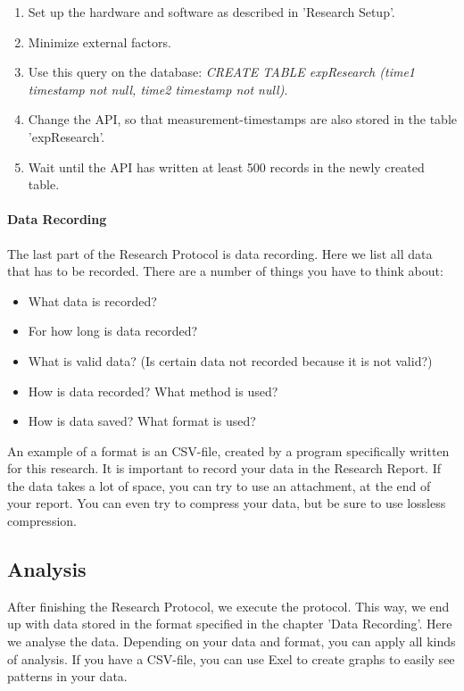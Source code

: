 \documentclass[10pt]{report}
\begin{document}
\begin{enumerate}
	\item Set up the hardware and software as described in 'Research Setup'.
	\item Minimize external factors.
	\item Use this query on the database: \textit{CREATE TABLE expResearch (time1 timestamp not null, time2 timestamp not null)}.
	\item Change the API, so that measurement-timestamps are also stored in the table 'expResearch'. 
	\item Wait until the API has written at least 500 records in the newly created table.
\end{enumerate}

\paragraph{Data Recording}

The last part of the Research Protocol is data recording. Here we list all data that has to be recorded. There are a number of things you have to think about:

\begin{itemize}
	\item What data is recorded?
	\item For how long is data recorded?
	\item What is valid data? (Is certain data not recorded because it is not valid?)
	\item How is data recorded? What method is used?
	\item How is data saved? What format is used?
\end{itemize}

\noindent An example of a format is an CSV-file, created by a program specifically written for this research. It is important to record your data in the Research Report. If the data takes a lot of space, you can try to use an attachment, at the end of your report. You can even try to compress your data, but be sure to use lossless compression.

\subsection{Analysis}

After finishing the Research Protocol, we execute the protocol. This way, we end up with data stored in the format specified in the chapter 'Data Recording'. Here we analyse the data. Depending on your data and format, you can apply all kinds of analysis. If you have a CSV-file, you can use Exel to create graphs to easily see patterns in your data.
\end{document}
